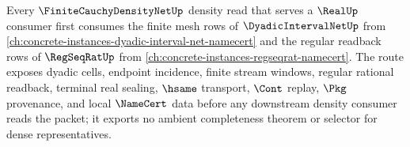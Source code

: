 Every $\FiniteCauchyDensityNetUp$ density read that serves a $\RealUp$ consumer first consumes the finite mesh rows of $\DyadicIntervalNetUp$ from \autoref{ch:concrete-instances-dyadic-interval-net-namecert} and the regular readback rows of $\RegSeqRatUp$ from \autoref{ch:concrete-instances-regseqrat-namecert}. The route exposes dyadic cells, endpoint incidence, finite stream windows, regular rational readback, terminal real sealing, $\hsame$ transport, $\Cont$ replay, $\Pkg$ provenance, and local $\NameCert$ data before any downstream density consumer reads the packet; it exports no ambient completeness theorem or selector for dense representatives.
